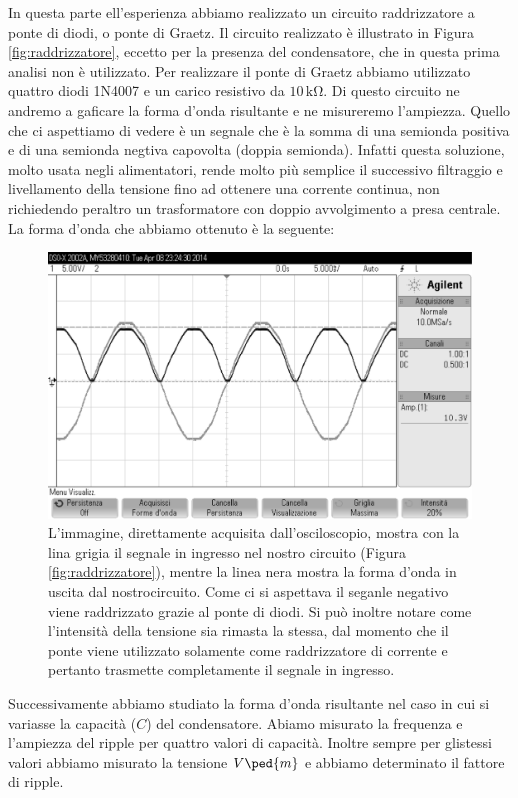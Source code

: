 In questa parte ell'esperienza abbiamo realizzato un circuito raddrizzatore a ponte di diodi, o ponte di Graetz. Il circuito realizzato è illustrato in Figura \ref{fig:raddrizzatore}, eccetto per la presenza del condensatore, che in questa prima analisi non è utilizzato.
Per realizzare il ponte di Graetz abbiamo utilizzato quattro diodi 1N4007 e un carico resistivo da $10\,\si{\kilo\ohm}$. Di questo circuito ne andremo a gaficare la forma d'onda risultante e ne misureremo l'ampiezza.
Quello che ci aspettiamo di vedere è un segnale che è la somma di una semionda positiva e di una semionda negtiva capovolta (doppia semionda).
Infatti questa soluzione, molto usata negli alimentatori, rende molto più semplice il successivo filtraggio e livellamento della tensione fino ad ottenere una corrente continua, non richiedendo peraltro un trasformatore con doppio avvolgimento a presa centrale.
La forma d'onda che abbiamo ottenuto è la seguente:

\begin{figure}
    \includegraphics[scale=0.5]{n2_bianco.pdf}
    \caption{L'immagine, direttamente acquisita dall'osciloscopio, mostra con la lina grigia il segnale in ingresso nel nostro circuito (Figura \ref{fig:raddrizzatore}), mentre la linea nera mostra la forma d'onda in uscita dal nostrocircuito. Come ci si aspettava il seganle negativo viene raddrizzato grazie al ponte di diodi. Si può inoltre notare come l'intensità della tensione sia rimasta la stessa, dal momento che il ponte viene utilizzato solamente come raddrizzatore di corrente e pertanto trasmette completamente il segnale in ingresso.}
    \label{fig:graetz2}
\end{figure}

Successivamente abbiamo studiato la forma d'onda risultante nel caso in cui si variasse la capacità ($C$) del condensatore. Abiamo misurato la frequenza e l'ampiezza del ripple per quattro valori di capacità. Inoltre sempre per glistessi valori abbiamo misurato la tensione $V\ped{m}$ e abbiamo determinato il fattore di ripple.

